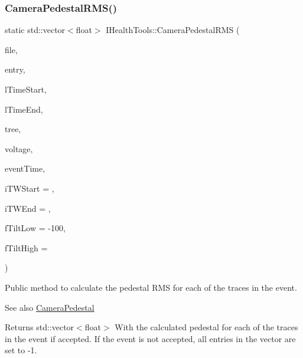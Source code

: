 \subsubsection{\texorpdfstring{Camera\+Pedestal\+R\+M\+S()}{CameraPedestalRMS()}}
{\footnotesize\ttfamily static std\+::vector$<$float$>$ I\+Health\+Tools\+::\+Camera\+Pedestal\+R\+MS (\begin{DoxyParamCaption}\item[{\hyperlink{classIFile}{I\+File} $\ast$}]{file,  }\item[{int}]{entry,  }\item[{unsigned long long}]{l\+Time\+Start,  }\item[{unsigned long long}]{l\+Time\+End,  }\item[{std\+::string}]{tree,  }\item[{float}]{voltage,  }\item[{unsigned long long $\ast$}]{event\+Time,  }\item[{int}]{i\+T\+W\+Start = {},  }\item[{int}]{i\+T\+W\+End = {},  }\item[{float}]{f\+Tilt\+Low = {\ttfamily -\/100},  }\item[{float}]{f\+Tilt\+High = {} }\end{DoxyParamCaption})\hspace{0.3cm}{\ttfamily [static]}}



Public method to calculate the pedestal R\+MS for each of the traces in the event. 

\begin{DoxySeeAlso}{See also}
\hyperlink{classIHealthTools_aa6bdf03f0f7595eec0a894c7c73134ea}{Camera\+Pedestal}
\end{DoxySeeAlso}
\begin{DoxyReturn}{Returns}
std\+::vector$<$float$>$ With the calculated pedestal for each of the traces in the event if accepted. If the event is not accepted, all entries in the vector are set to -\/1. 
\end{DoxyReturn}
\mbox{\label{classIHealthTools_ab44aea2194293cba7ed3975cf1b788cf}} 
